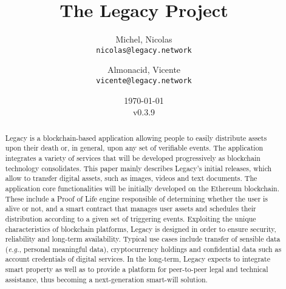\documentclass[12pt,french,english,notitlepage]{report} %
\title{The Legacy Project}
\author{
  Michel, Nicolas\\
  \texttt{nicolas@legacy.network}
  \and
  Almonacid, Vicente\\
  \texttt{vicente@legacy.network}
}
\date{\today\\v0.3.9}
\newcommand{\bibpath}{.}
\begin{document}

\maketitle
\begin{abstract}
    Legacy is a blockchain-based application allowing people to easily distribute assets upon their death or, in general, upon any set of verifiable events.
    The application integrates a variety of services that will be developed progressively as blockchain technology consolidates. 
    This paper mainly describes Legacy's initial releases, which allow to transfer digital assets, such as images, videos and text documents. 
    The application core functionalities will be initially developed on the Ethereum blockchain. These include a Proof of Life engine responsible of determining whether the user is alive or not, and a smart contract that manages user assets and schedules their distribution according to a given set of triggering events.
    Exploiting the unique characteristics of blockchain platforms, Legacy is designed in order to ensure security, reliability and long-term availability. 
    Typical use cases include transfer of sensible data (\textit{e.g.}, personal meaningful data), cryptocurrency holdings and confidential data such as account credentials of digital services. 
    In the long-term, Legacy expects to integrate smart property as well as to provide a platform for peer-to-peer legal and technical assistance, thus becoming a next-generation smart-will solution.

\end{abstract}



\tableofcontents




%



%

%
%



%
%
%
%
\printbibliography
\end{document}
